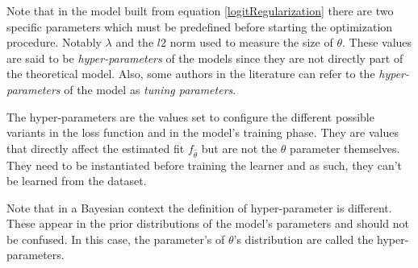 Note that in the model built from equation \ref{logitRegularization} there are two specific parameters which must be predefined before starting the optimization procedure. Notably  $\lambda$ and the $l2$ norm used to measure the size of $\theta$. These values are said to be \textit{hyper-parameters} of the models since they are not directly part of the theoretical model. Also, some authors in the literature can refer to the \textit{hyper-parameters} of the model as \textit{tuning parameters}.   

The hyper-parameters are the values set to configure the different possible variants in the loss function and in the model's training phase.  They are values that directly affect the estimated fit $f_{\hat{\theta}}$ but are not the $\theta$ parameter themselves.  They need to be instantiated before training the learner and as such, they can't be learned from the dataset.

Note that in a Bayesian context the definition of hyper-parameter is different. These appear in the  prior distributions of the model's parameters and should not be confused. In this case, the parameter's of $\theta$'s distribution are called the hyper-parameters. 



\textit{}

\textit{}

\textit{}

\textit{}

\textit{} 